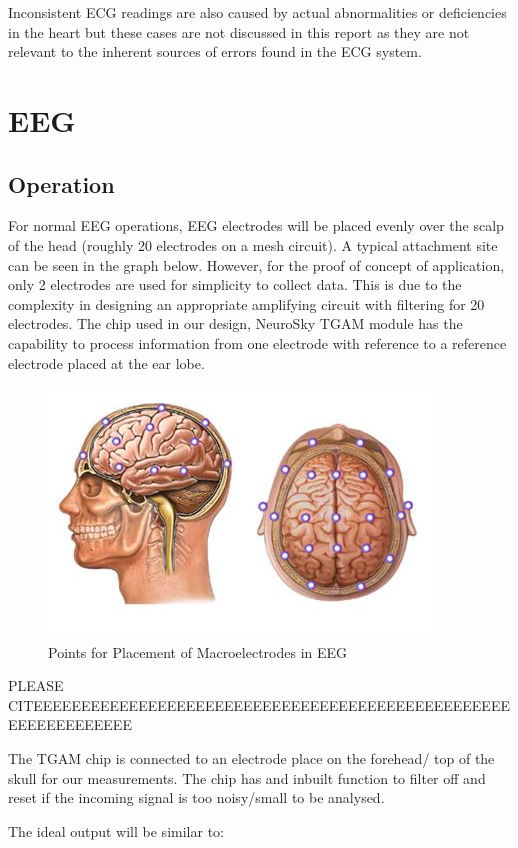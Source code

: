 Inconsistent ECG readings are also caused by actual abnormalities or deficiencies in the heart but these cases are not discussed in this report as they are not relevant to the inherent sources of errors found in the ECG system. 

\section{EEG}

\subsection{Operation}
For normal EEG operations, EEG electrodes will be placed evenly over the scalp of the head (roughly 20 electrodes on a mesh circuit). A typical attachment site can be seen in the graph below. However, for the proof of concept of application, only 2 electrodes are used for simplicity to collect data. This is due to the complexity in designing an appropriate amplifying circuit with filtering for 20 electrodes. The chip used in our design, NeuroSky TGAM module has the capability to process information from one electrode with reference to a reference electrode placed at the ear lobe. 

\begin{figure}[H]
	\centering
	\includegraphics[width=0.5\linewidth]{jiahuipic5.jpg}
	\caption{Points for Placement of Macroelectrodes in EEG}
\end{figure} 

PLEASE CITEEEEEEEEEEEEEEEEEEEEEEEEEEEEEEEEEEEEEEEEEEEEEEEEEEEEEEEEEEEEEEE

The TGAM chip is connected to an electrode place on the forehead/ top of the skull for our measurements. The chip has and inbuilt function to filter off and reset if the incoming signal is too noisy/small to be analysed. 

The ideal output will be similar to: 

